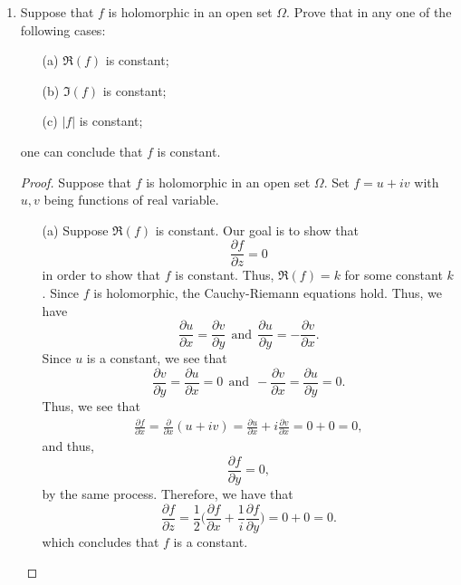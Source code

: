 \documentclass[11pt,a4paper]{book}
\begin{document}
\begin{enumerate}
\begin{proof}
    \end{proof}
    \item Suppose that \( f  \) is holomorphic in an open set \( \Omega  \). Prove that in any one of the following cases:
        \begin{enumerate}
            \item[(a)] \( \Re(f) \) is constant;
            \item[(b)] \( \Im(f) \) is constant;
            \item[(c)] \( | f |  \) is constant;
        \end{enumerate}
        one can conclude that \( f  \) is constant.
        \begin{proof} Suppose that \( f  \) is holomorphic in an open set \( \Omega \). Set \( f = u + iv \) with \( u, v  \) being functions of real variable.
            \begin{enumerate}
                \item[(a)] Suppose \( \Re(f) \) is constant. Our goal is to show that
                    \[  \frac{\partial f }{\partial z }  = 0 \]
                    in order to show that \( f  \) is constant. Thus, \( \Re(f) = k \) for some constant \( k  \). Since \( f  \) is holomorphic, the Cauchy-Riemann equations hold. Thus, we have
                    \[  \frac{\partial u  }{\partial x  }  = \frac{\partial v }{\partial y }  \ \ \text{and} \ \ \frac{\partial u }{\partial y }  = - \frac{\partial v }{\partial x }. \]
                    Since \( u  \) is a constant, we see that 
                    \[ \frac{\partial v }{\partial y }  =   \frac{\partial u }{\partial x   } = 0 \ \ \text{and} \ \ - \frac{\partial v  }{\partial x } =  \frac{\partial u }{\partial y }  = 0.  \]
                    Thus, we see that
                    \begin{align*}
                        \frac{\partial f }{\partial x }  = \frac{\partial  }{\partial x }  (  u + iv ) 
                                                         = \frac{\partial u }{\partial x } + i \frac{\partial v }{\partial x }  
                                                         = 0 + 0 
                                                         = 0,
\end{align*}
and thus,
\[  \frac{\partial f }{\partial y }  = 0,  \]
by the same process. Therefore, we have that
\[  \frac{\partial f }{\partial z }  = \frac{ 1 }{ 2 }  \Big(  \frac{\partial f }{\partial x }  + \frac{ 1 }{ i }  \frac{\partial f }{\partial y }  \Big) = 0 + 0 = 0. \]
which concludes that \( f  \) is a constant.

\end{enumerate}
\end{proof}
\end{enumerate}
\end{document}
